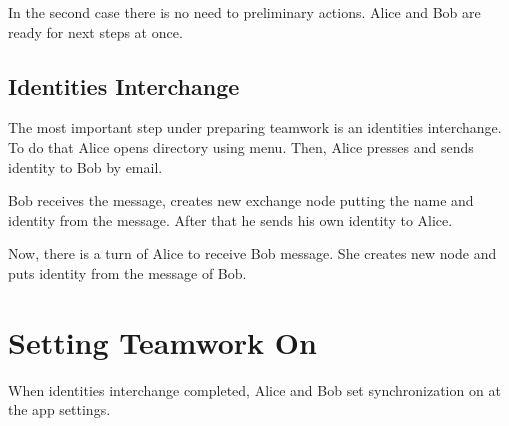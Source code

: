\documentclass[a4paper,10pt,english]{sphinxmanual}
\begin{document}
In the second case there is no need to preliminary actions. Alice and Bob are ready for next steps at once.


\subsection{Identities Interchange}
\label{\detokenize{teamwork:identities-interchange}}
The most important step under preparing teamwork is an identities interchange. To do that
Alice opens  directory using  menu. Then,
Alice presses  and sends identity to Bob by email.

\noindent{}
\noindent{}
\noindent{}
\noindent{}
\noindent{}
\noindent{}

Bob receives the message, creates new exchange node putting the name and identity from the message.
After that he sends his own identity to Alice.

\noindent{}
\noindent{}
\noindent{}
\noindent{}
\noindent{}

Now, there is a turn of Alice to receive Bob message. She creates new node and puts identity
from the message of Bob.


\section{Setting Teamwork On}
\label{\detokenize{teamwork:setting-teamwork-on}}
When identities interchange completed, Alice and Bob set synchronization on at the app settings.
\end{document}
